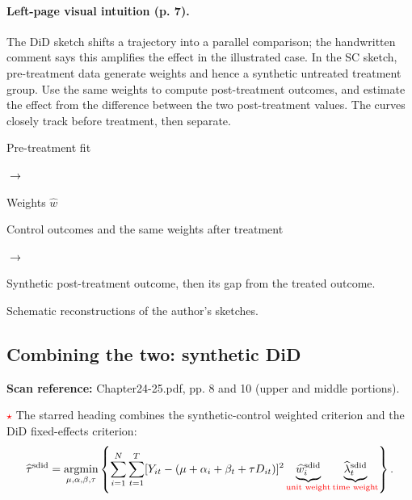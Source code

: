 \documentclass[11pt,a4paper]{article}
\newcommand{\sourcepages}[1]{\par{\small\sffamily\color{muted}\textbf{Scan reference:} #1\par}\nobreak\smallskip\nopagebreak[4]}
\newcommand{\inkred}[1]{\textcolor{red}{#1}}
\newcommand{\notearrow}[3]{%
\par\Needspace{6\baselineskip}\smallskip
\noindent\begin{minipage}[c]{0.43\linewidth}\raggedright\color{#1}#2\end{minipage}%
\hfill\textcolor{#1}{\(\longrightarrow\)}\hfill%
\begin{minipage}[c]{0.43\linewidth}\raggedright#3\end{minipage}\par\smallskip}
\begin{document}
\paragraph{Left-page visual intuition (p. 7).}
The DiD sketch shifts a trajectory into a parallel comparison; the handwritten comment says this amplifies the effect in the illustrated case. In the SC sketch, pre-treatment data generate weights and hence a synthetic untreated treatment group. Use the same weights to compute post-treatment outcomes, and estimate the effect from the difference between the two post-treatment values. The curves closely track before treatment, then separate.
\notearrow{black}{Pre-treatment fit}{Weights \(\widehat w\)}
\notearrow{black}{Control outcomes and the same weights after treatment}{Synthetic post-treatment outcome, then its gap from the treated outcome.}
\begin{center}

{\small Schematic reconstructions of the author's sketches.}
\end{center}


\subsection{Combining the two: synthetic DiD}
\sourcepages{Chapter24-25.pdf, pp. 8 and 10 (upper and middle portions).}
\inkred{\(\star\)} The starred heading combines the synthetic-control weighted criterion and the DiD fixed-effects criterion:
\[
\widehat\tau^{\mathrm{sdid}}
=\operatorname*{argmin}_{\mu,\alpha,\beta,\tau}
\left\{\sum_{i=1}^{N}\sum_{t=1}^{T}
[Y_{it}-(\mu+\alpha_i+\beta_t+\tau D_{it})]^2
\underbrace{\widehat w_i^{\mathrm{sdid}}}_{\textcolor{red}{\text{unit weight}}}
\underbrace{\widehat\lambda_t^{\mathrm{sdid}}}_{\textcolor{red}{\text{time weight}}}\right\}.
\]
\end{document}
